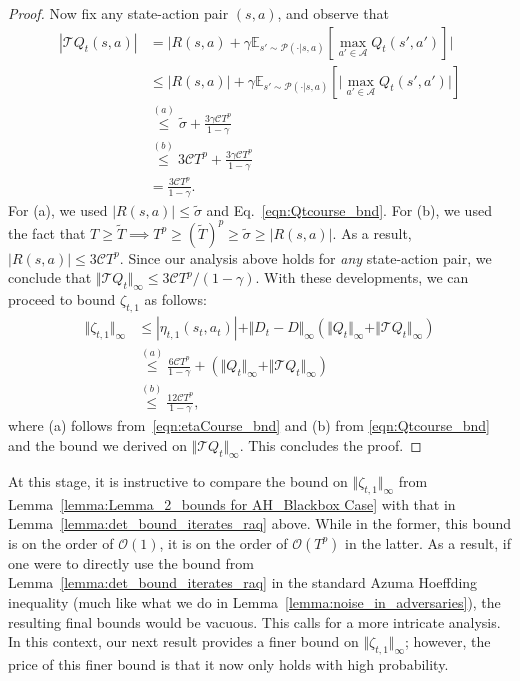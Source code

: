 \documentclass{article}
\newcommand{\mc}{\mathcal}
\begin{document}
\begin{proof}
Now fix any state-action pair $(s,a)$, and observe that
\begin{equation}
\begin{aligned}
|\mc{T}Q_t(s,a)| &= \lvert R(s,a) + \gamma \mathbb{E}_{s' \sim \mc{P}(\cdot| s,a)}[ \max_{a' \in \mc{A}} Q_t(s',a')] \rvert \\
&\leq \lvert R(s,a) \rvert + \gamma \mathbb{E}_{s' \sim \mc{P}(\cdot| s,a)} [ \lvert \max_{a' \in \mc{A}} Q_t(s',a') \rvert] \\
&\overset{(a)}{\le} \tilde{\sigma} + \frac{3 \gamma \mathcal{C} T^p}{1 - \gamma}\\
&\overset{(b)}{\le} 3 \mc{C} T^p + \frac{3 \gamma \mathcal{C} T^p}{1 - \gamma}\\
& = \frac{3 \mathcal{C} T^p}{1 - \gamma}.
\end{aligned}
\end{equation}
For (a), we used $|R(s,a)| \leq \tilde{\sigma}$ and Eq.~\eqref{eqn:Qtcourse_bnd}. For (b), we used the fact that $T \geq \tilde{T}  \implies T^p \geq (\tilde{T})^p \geq \tilde{\sigma} \geq |R(s,a)|$. As a result, $|R(s,a)| \leq 3 \mc{C} T^p.$ Since our analysis above holds for \emph{any} state-action pair, we conclude that $\Vert \mc{T} Q_t \Vert_{\infty} \leq 3 \mc{C} T^p /(1-\gamma).$ With these developments, we can proceed to bound  \(\zeta_{t,1}\) as follows:
\begin{equation*}
\begin{aligned}
\Vert \zeta_{t,1} \Vert_{\infty} &\le \left| \eta_{t,1}(s_t,a_t) \right| + \Vert D_t - D \Vert_{\infty} \left( \Vert Q_t \Vert_{\infty} + \Vert \mc{T} Q_t \Vert_{\infty} \right)
\\
&\overset{(a)}{\le} \frac{6 \mathcal{C} T^p}{1 - \gamma} + \left( \Vert Q_t \Vert_{\infty} + \Vert \mc{T} Q_t \Vert_{\infty} \right) \\
& \overset{(b)}{\le} \frac{12 \mathcal{C} T^p}{1 - \gamma},
\end{aligned}
\end{equation*}
where (a) follows from~\eqref{eqn:etaCourse_bnd} and (b) from \eqref{eqn:Qtcourse_bnd} and the bound we derived on $\Vert \mc{T} Q_t \Vert_{\infty}$. This concludes the proof. 
\end{proof}

At this stage, it is instructive to compare the bound on $\Vert \zeta_{t,1} \Vert_{\infty}$ from Lemma~\ref{lemma:Lemma_2_bounds for AH_Blackbox Case} with that in Lemma~\ref{lemma:det_bound_iterates_raq} above. While in the former, this bound is on the order of $\mc{O}(1)$, it is on the order of $\mc{O}(T^p)$ in the latter. As a result, if one were to directly use the bound from Lemma~\ref{lemma:det_bound_iterates_raq} in the standard Azuma Hoeffding inequality (much like what we do in Lemma~\ref{lemma:noise_in_adversaries}), the resulting final bounds would be vacuous. This calls for a more intricate analysis. In this context, our next result provides a finer bound on $\Vert \zeta_{t,1} \Vert_{\infty}$; however, the price of this finer bound is that it now only holds with high probability. 
\end{document}
